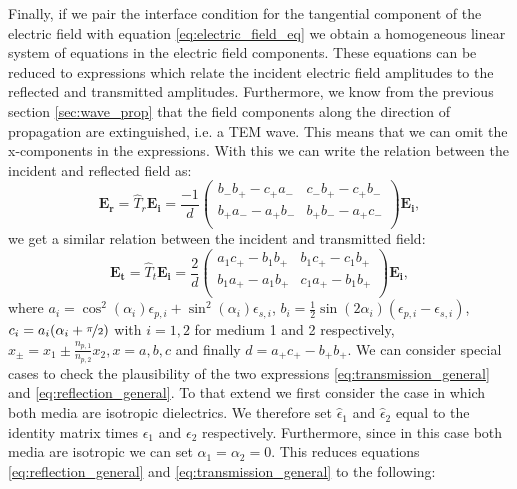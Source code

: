 Finally, if we pair the interface condition for the tangential component of the electric field with equation \ref{eq:electric_field_eq} we obtain a homogeneous linear system of equations in the electric field components. These equations can be reduced to expressions which relate the incident electric field amplitudes to the reflected and transmitted amplitudes. Furthermore, we know from the previous section \ref{sec:wave_prop} that the field components along the direction of propagation are extinguished, i.e. a TEM wave. This means that we can omit the x-components in the expressions. With this we can write the relation between the incident and reflected field as:
\begin{equation}
    \label{eq:reflection_general}
    \bm{E_r} = \hat{T}_r \bm{E_i} =
    \frac{-1}{d}
    \begin{pmatrix}
        b_-b_+ - c_+a_- & c_-b_+ - c_+b_- \\
        b_+a_- - a_+b_- & b_+b_- - a_+c_- \\
    \end{pmatrix}
    \bm{E_i},
\end{equation}
we get a similar relation between the incident and transmitted field:
\begin{equation}
    \label{eq:transmission_general}
    \bm{E_t} = \hat{T}_t \bm{E_i} =
    \frac{2}{d}
    \begin{pmatrix}
        a_1c_+ - b_1b_+ & b_1c_+ - c_1b_+ \\
        b_1a_+ - a_1b_+ & c_1a_+ - b_1b_+ \\
    \end{pmatrix}
    \bm{E_i},
\end{equation}
where $a_i=\cos^2(\alpha_i)\epsilon_{p,i}+\sin^2(\alpha_i)\epsilon_{s,i}$, $b_i=\frac{1}{2}\sin(2\alpha_i)(\epsilon_{p,i}-\epsilon_{s,i})$, $c_i = a_i(\alpha_i + \nicefrac{\pi}{2})$ with $i=1,2$ for medium 1 and 2 respectively, $x_{\pm}=x_1\pm \frac{n_{p,1}}{n_{p,2}} x_2, x=a,b,c$ and finally $d=a_+c_+-b_+b_+$. We can consider special cases to check the plausibility of the two expressions \ref{eq:transmission_general} and \ref{eq:reflection_general}. To that extend we first consider the case in which both media are isotropic dielectrics. We therefore set $\hat{\epsilon}_1$ and $\hat{\epsilon}_2$ equal to the identity matrix times $\epsilon_1$ and $\epsilon_2$ respectively. Furthermore, since in this case both media are isotropic we can set $\alpha_1 = \alpha_2 = 0$. This reduces equations \ref{eq:reflection_general} and \ref{eq:transmission_general} to the following:
